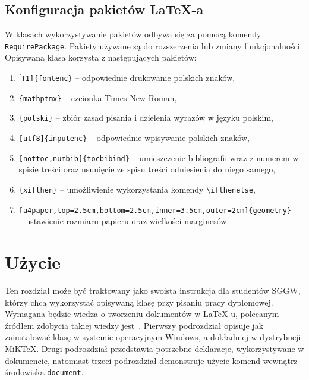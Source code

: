 \documentclass{SGGW-thesis}
\begin{document}
\section{Konfiguracja pakietów \LaTeX-a}
\label{sec:konfiguracja-pakietow}
W klasach wykorzystywanie pakietów odbywa się za pomocą komendy \verb|RequirePackage|. Pakiety używane są do rozszerzenia lub zmiany funkcjonalności. Opisywana klasa korzysta z następujących pakietów:
\begin{enumerate}[label=\alph*.,itemsep=0pt]
\item{[\verb|T1]{fontenc}| -- odpowiednie drukowanie polskich znaków,}
\item{\verb|{mathptmx}| -- czcionka Times New Roman,}
\item{\verb|{polski}| -- zbiór zasad pisania i dzielenia wyrazów w języku polskim,}
\item{\verb|[utf8]{inputenc}| -- odpowiednie wpisywanie polskich znaków,}
\item{\verb|[nottoc,numbib]{tocbibind}| -- umieszczenie bibliografii wraz z numerem w spisie treści oraz usunięcie ze spisu treści odniesienia do niego samego,}
\item{\verb|{xifthen}| -- umożliwienie wykorzystania komendy \verb|\ifthenelse|,}
\item{\verb|[a4paper,top=2.5cm,bottom=2.5cm,inner=3.5cm,outer=2cm]{geometry}|\\ -- ustawienie rozmiaru papieru oraz wielkości marginesów.}
\end{enumerate}


\chapter{Użycie}
Ten rozdział może być traktowany jako swoista instrukcja dla studentów SGGW, którzy chcą wykorzystać opisywaną klasę przy pisaniu pracy dyplomowej. Wymagana będzie wiedza o tworzeniu dokumentów w \LaTeX-u, polecanym źródłem zdobycia takiej wiedzy jest~\cite{latexcompanion}. Pierwszy podrozdział opisuje jak zainstalować klasę w systemie operacyjnym Windows, a dokładniej w dystrybucji MiK\TeX. Drugi podrozdział przedstawia  potrzebne deklaracje, wykorzystywane w dokumencie, natomiast trzeci podrozdział demonstruje użycie komend wewnątrz środowiska \verb|document|.
\end{document}
